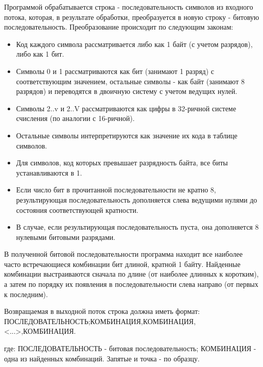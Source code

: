 
Программой обрабатывается строка - последовательность символов из входного потока, которая, в результате обработки, преобразуется в новую строку - битовую последовательность.
Преобразование происходит по следующим законам:

\begin{itemize}
    \item Код каждого символа рассматривается либо как 1 байт (с учетом разрядов), либо как 1 бит.
    \item Символы 0 и 1 рассматриваются как бит (занимают 1 разряд) с соответствующим значением, остальные символы - как байт (занимают 8 разрядов) и переводятся в двоичную систему с учетом ведущих нулей.
    \item Символы 2..v и 2..V рассматриваются как цифры в 32-ричной системе счисления (по аналогии с 16-ричной).
    \item Остальные символы интерпретируются как значение их кода в таблице символов.
    \item Для символов, код которых превышает разрядность байта, все биты устанавливаются в 1.
    \item Если число бит в прочитанной последовательности не кратно 8, результирующая последовательность дополняется слева ведущими нулями до состояния соответствующей кратности.
    \item В случае, если результирующая последовательность пуста, она дополняется 8 нулевыми битовыми разрядами.
\end{itemize}

В полученной битовой последовательности программа находит все наиболее часто встречающиеся комбинации бит длиной, кратной 1 байту. Найденные комбинации выстраиваются сначала по длине (от наиболее длинных к коротким), а затем по порядку их появления в последовательности слева направо (от первых к последним).

Возвращаемая в выходной поток строка должна иметь формат:
ПОСЛЕДОВАТЕЛЬНОСТЬ;КОМБИНАЦИЯ,КОМБИНАЦИЯ,<...>,КОМБИНАЦИЯ.

где: ПОСЛЕДОВАТЕЛЬНОСТЬ - битовая последовательность; КОМБИНАЦИЯ - одна из найденных комбинаций. Запятые и точка - по образцу.

